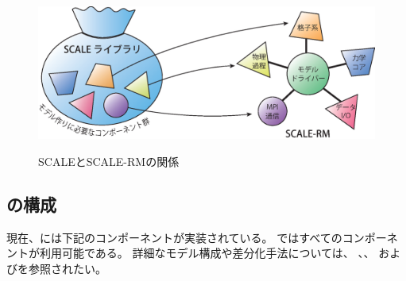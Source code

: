 \begin{figure}[hbt]
\begin{center}
  \includegraphics[width=0.9\hsize]{./figure/scale.eps}\\
  \caption{SCALEとSCALE-RMの関係}
  \label{fig:scale-rm}
\end{center}
\end{figure}



\subsection{\scalerm の構成}  \label{subsec:sturcture_scale_rm}
現在、\scalerm には下記のコンポーネントが実装されている。
\scalerm ではすべてのコンポーネントが利用可能である。
詳細なモデル構成や差分化手法については、
\citet{scale_2015}、\citet{satoy_2015b}、
および\citet{nishizawa_2015}を参照されたい。\\

